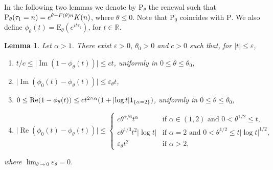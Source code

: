 \documentclass[11pt]{article}
\newtheorem{lemm}[theo]{Lemma}
\theoremstyle{definition}
\numberwithin{equation}{section}
\numberwithin{figure}{section}
\numberwithin{table}{section}
\DeclareMathOperator{\re}{Re}
\DeclareMathOperator{\im}{Im}
\newcommand{\bbR}{{\ensuremath{\mathbb R}}}
\newcommand{\ga}{\alpha}
\newcommand{\gep}{\varepsilon}
\newcommand{\gt}{\theta}
\newcommand\bP{\ensuremath{\mathrm{P}}}
\newcommand\bE{\ensuremath{\mathrm{E}}}
\newcommand{\ind}{{\sf 1}}
\begin{document}
In the following two lemmas we denote by $\bP_\gt$ the renewal such that $\bP_\gt(\tau_1 = n) =\linebreak e^{\gt - F(\gt) n} K(n)$, where $\gt\le 0$. Note that $\bP_0$ coincides with $\bP$. We also define $\phi_\gt(t) = \bE_\gt(e^{i t \tau_1})$, for $t\in\bbR$.

\begin{lemm}\label{lem:UnifEstimatesCFs}
Let $\ga > 1$. There exist $\gep>0$, $\gt_0>0$ and $c>0$ such that, for $|t| \le \gep$,
\begin{enumerate}
\item \label{A.9.1} $t/c \le \mathopen{|}\im(1- \phi_\gt(t))| \le ct$, uniformly in $0 \le \gt \le \gt_0$,
\item \label{A.9.2} $\mathopen{|}\im(\phi_0(t) -\phi_\gt(t))| \le \gep_\gt t$,
\item \label{A.9.3} $0 \le \re(1- \phi_\gt(t)) \le ct^{2\wedge \ga}{(1+ \mathopen{|}\log t|\ind_{\{\ga = 2\}})}$, uniformly in $0\le \gt \le \gt_0$,
\item \label{A.9.4} $\mathopen{|}\re(\phi_0(t) -\phi_\gt(t))| \le
\begin{cases}
c \gt^{\ga / 6} t^\ga& \text{if } \ga\in(1,2) \text{ and } 0 < \gt^{1/2} \le t,\\[2pt] { c \gt^{1/3} t^2 \mathopen{|}\log t|} & \text{if } \ga=2 \text{ and } 0 < \gt^{1/2} \le t\mathopen{|}\log t|^{1/2},\\[2pt]
\gep_\gt t^2& \text{if } \ga> 2,
\end{cases}$
\end{enumerate}
where $\lim_{\gt\to 0} \gep_\gt = 0$.
\end{lemm}
\end{document}
